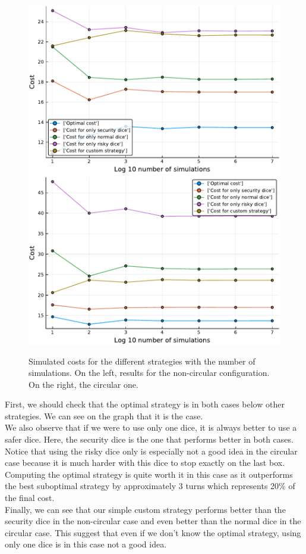 \begin{figure}[H]
\centering
\includegraphics[scale=0.41]{../img/board_unif_low/cost_subopt_log_noncirc.pdf}
\includegraphics[scale=0.41]{../img/board_unif_low/cost_subopt_log_circ.pdf}
\caption{Simulated costs for the different strategies with the number of simulations. On the left, results for the non-circular configuration. On the right, the circular one.}
\label{fig:cost_subopt_log}
\end{figure}

First, we should check that the optimal strategy is in both cases below other strategies. 
We can see on the graph that it is the case. \\
We also observe that if we were to use only one dice, it is always better to use a safer dice. 
Here, the security dice is the one that performs better in both cases. 
Notice that using the risky dice only is especially not a good idea in the circular case because it is much harder with this dice to stop exactly on the last box. \\
Computing the optimal strategy is quite worth it in this case as it outperforms the best suboptimal strategy by approximately 3 turns which represents 20\% of the final cost. \\
Finally, we can see that our simple custom strategy performs better than the security dice in the non-circular case and even better than the normal dice in the circular case. 
This suggest that even if we don't know the optimal strategy, using only one dice is in this case not a good idea.  
